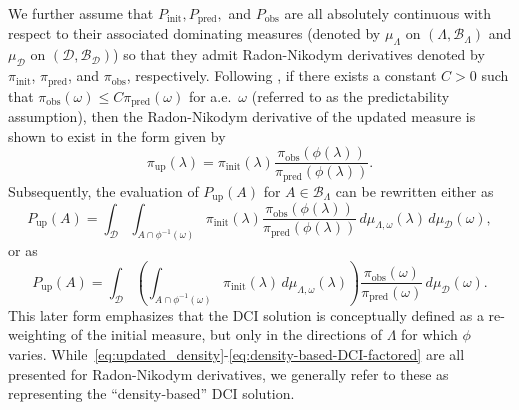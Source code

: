 \documentclass{article}
\newcommand{\B}{\mathcal{B}}
\newcommand{\initmeas}{P_{\text{init}}}
\newcommand{\updatemeas}{P_{\text{up}}}
\newcommand{\initdens}{\pi_{\text{init}}}
\newcommand{\updatedens}{\pi_{\text{up}}}
\newcommand{\predictmeas}{P_\text{pred}}
\newcommand{\predictdens}{\pi_\text{pred}}
\newcommand{\obsmeas}{P_{\text{obs}}}
\newcommand{\obsdens}{\pi_{\text{obs}}}
\begin{document}
We further assume that $\initmeas, \predictmeas,$ and $\obsmeas$ are all absolutely continuous with respect to their associated dominating measures (denoted by $\mu_\Lambda$ on $(\Lambda,\B_\Lambda)$ and $\mu_\mathcal{D}$ on $(\mathcal{D}, \B_\mathcal{D})$) so that they admit Radon-Nikodym derivatives denoted by $\initdens$, $\predictdens$, and $\obsdens$, respectively. 
Following \cite{BJW18a}, if there exists a constant $C>0$ such that $\obsdens(\omega)\leq C\predictdens(\omega)$ for a.e.~$\omega$ (referred to as the predictability assumption), then the Radon-Nikodym derivative of the updated measure is shown to exist in the form given by
\begin{equation}\label{eq:updated_density}
    \updatedens(\lambda) = \initdens(\lambda)\frac{\obsdens(\phi(\lambda))}{\predictdens(\phi(\lambda))}.
\end{equation}
Subsequently, the evaluation of $\updatemeas(A)$ for $A\in\B_\Lambda$ can be rewritten either as
\begin{equation}\label{eq:density-based-DCI}
    \updatemeas(A) = \int_\mathcal{D} \int_{A\cap \phi^{-1}(\omega)} \initdens(\lambda)\frac{\obsdens(\phi(\lambda))}{\predictdens(\phi(\lambda))}\, d\mu_{\Lambda,\omega}(\lambda)\,  d\mu_\mathcal{D}(\omega),
\end{equation}
or as
\begin{equation}\label{eq:density-based-DCI-factored}
    \updatemeas(A) = \int_\mathcal{D} \left(\int_{A\cap \phi^{-1}(\omega)} \initdens(\lambda)\, d\mu_{\Lambda,\omega}(\lambda)\right) \frac{\obsdens(\omega)}{\predictdens(\omega)}\,  d\mu_\mathcal{D}(\omega).
\end{equation}
This later form emphasizes that the DCI solution is conceptually defined as a re-weighting of the initial measure, but only in the directions of $\Lambda$ for which $\phi$ varies.
While~\eqref{eq:updated_density}-\eqref{eq:density-based-DCI-factored} are all presented for Radon-Nikodym derivatives, we generally refer to these as representing the ``density-based'' DCI solution.
\end{document}

